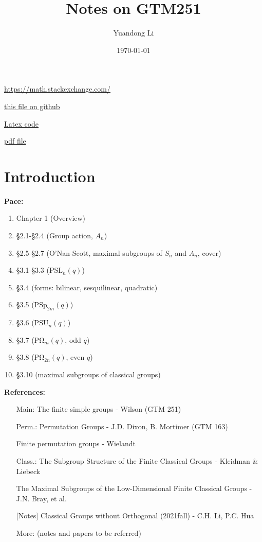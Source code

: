 \documentclass[a4,11pt]{article}
\title{Notes on GTM251}
\author{Yuandong Li}
\date{\today}
\def\PSL{\mathrm{PSL}}
\def\PSU{\mathrm{PSU}}
\def\PSp{\mathrm{PSp}}
\def\PO{\mathrm{P\Omega}}
\def\PSL{\mathrm{PSL}}
\begin{document}
\maketitle

\tableofcontents
\newpage

\url{https://math.stackexchange.com/}

\href{https://raw.githubusercontent.com/ocbaby/research_notes/fbfbf39a26362487ce0c1859e49a89646d013da1/Reading\%20Notes/Finite\%20Simple\%20Groups/wilson.pdf}{this file on github}

\href{./wilson.tex}{Latex code}

\href{./wilson.pdf}{pdf file}

\section{Introduction}
\textbf{Pace: }
\begin{enumerate}[Lesson 1:]
	\item Chapter 1 (Overview)
	\item \S 2.1-\S 2.4 (Group action, $A_n$)
	\item \S 2.5-\S 2.7 (O'Nan-Scott, maximal subgroups of $S_n$ and $A_n$, cover)
	\item \S 3.1-\S 3.3 ($\PSL_n(q)$)
	\item \S 3.4 (forms: bilinear, sesquilinear, quadratic)
	\item \S 3.5 ($\PSp_{2m}(q)$)
	\item \S 3.6 ($\PSU_n(q)$)
	\item \S 3.7 ($\PO_{m}(q)$, odd $q$)
	\item \S 3.8 ($\PO_{2n}(q)$, even $q$)
	\item \S 3.10 (maximal subgroups of classical groups)
\end{enumerate}

\vline 

\noindent \textbf{References:}
\begin{itemize}
	\item[Main:] The finite simple groups - Wilson (GTM 251)
	\item[Perm.:] Permutation Groups - J.D. Dixon, B. Mortimer (GTM 163)
	\item[ ] Finite permutation groups - Wielandt
	\item[Class.:] The Subgroup Structure of the Finite Classical Groups - Kleidman \& Liebeck
	\item[ ] The Maximal Subgroups of the Low-Dimensional Finite Classical Groups - J.N. Bray, et al.
		\item[ ] [Notes] Classical Groups without Orthogonal (2021fall) - C.H. Li, P.C. Hua
	\item[More:] (notes and papers to be referred)
	\item[ ]
\end{itemize}
\end{document}
